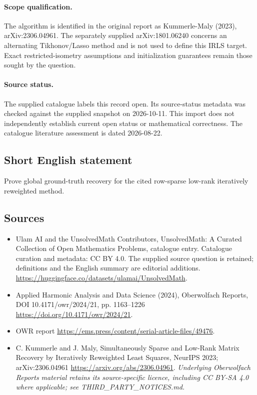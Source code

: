 \documentclass[11pt]{article}
\begin{document}
\paragraph{Scope qualification.}
The algorithm is identified in the original report as Kummerle-Maly (2023), arXiv:2306.04961. The separately supplied arXiv:1801.06240 concerns an alternating Tikhonov/Lasso method and is not used to define this IRLS target. Exact restricted-isometry assumptions and initialization guarantees remain those sought by the question.
\paragraph{Source status.}
The supplied catalogue labels this record open. Its source-status metadata was checked against the supplied snapshot on 2026-10-11. This import does not independently establish current open status or mathematical correctness. The catalogue literature assessment is dated 2026-08-22.
\subsection{Short English statement}
Prove global ground-truth recovery for the cited row-sparse low-rank iteratively reweighted method.
\subsection{Sources}
\begin{itemize}
\item[\hypertarget{source:statement:1}{S1}] Ulam AI and the UnsolvedMath Contributors, UnsolvedMath: A Curated Collection of Open Mathematics Problems, catalogue entry. Catalogue curation and metadata: CC BY 4.0. The supplied source question is retained; definitions and the English summary are editorial additions.
\url{https://huggingface.co/datasets/ulamai/UnsolvedMath}.
\item[\hypertarget{source:statement:2}{S2}] Applied Harmonic Analysis and Data Science (2024), Oberwolfach Reports, DOI 10.4171/owr/2024/21, pp. 1163--1226
\url{https://doi.org/10.4171/owr/2024/21}.
\item[\hypertarget{source:statement:3}{S3}] OWR report
\url{https://ems.press/content/serial-article-files/49476}.
\item[\hypertarget{source:statement:4}{S4}] C. Kummerle and J. Maly, Simultaneously Sparse and Low-Rank Matrix Recovery by Iteratively Reweighted Least Squares, NeurIPS 2023; arXiv:2306.04961
\url{https://arxiv.org/abs/2306.04961}.
\textit{Underlying Oberwolfach Reports material retains its source-specific licence, including CC BY-SA 4.0 where applicable; see THIRD\_PARTY\_NOTICES.md.}
\end{itemize}
\end{document}
